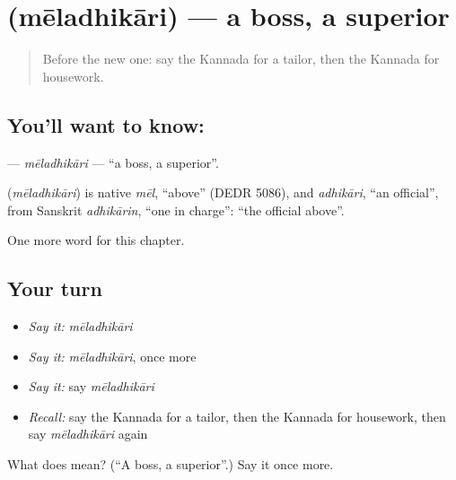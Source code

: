 \section[\texorpdfstring{\kn{ಮೇಲಧಿಕಾರಿ} (mēladhikāri)}{ಮೇಲಧಿಕಾರಿ (mēladhikāri)}]{ (mēladhikāri) — a boss, a superior}

\label{lesson:KA-C194-meladhikari}



\begin{quote}
Before the new one: say the Kannada for a tailor, then the Kannada for housework.
\end{quote}

\subsection*{You'll want to know: }
\textbf{} — \emph{mēladhikāri} — \textquotedblleft{}a boss, a superior\textquotedblright{}.

\begin{cousinweb}
\textbf{} (\emph{mēladhikāri}) is native \emph{mēl}, \textquotedblleft{}above\textquotedblright{} (DEDR 5086), and \emph{adhikāri}, \textquotedblleft{}an official\textquotedblright{}, from Sanskrit \emph{adhikārin}, \textquotedblleft{}one in charge\textquotedblright{}: \textquotedblleft{}the official above\textquotedblright{}.
\end{cousinweb}

\begin{grammarlens}[title={What you've built}]
One more word for this chapter.
\end{grammarlens}

\subsection*{Your turn}
\begin{itemize}
\raggedright
  \item \emph{Say it:} \emph{mēladhikāri}
  \item \emph{Say it:} \emph{mēladhikāri}, once more
  \item \emph{Say it:} say \emph{mēladhikāri}
  \item \emph{Recall:} say the Kannada for a tailor, then the Kannada for housework, then say \emph{mēladhikāri} again
\end{itemize}

\begin{tcolorbox}[breakable,colback=teal!4,colframe=teal!35!black,title={Before you move on}]
What does  mean? (\textquotedblleft{}A boss, a superior\textquotedblright{}.) Say it once more.
\end{tcolorbox}
